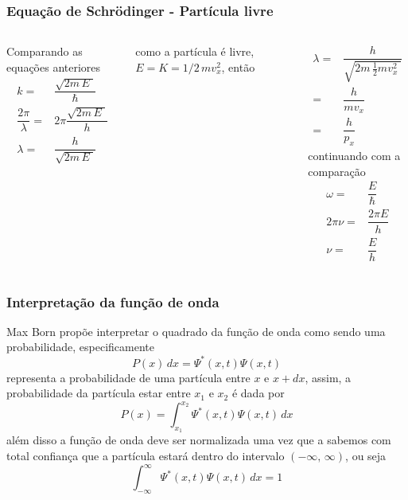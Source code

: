 \documentclass[12pt,brazil]{beamer}
\begin{document}
\begin{frame}
  \frametitle{Equação de Schrödinger - Partícula livre}
  \fontsize{9pt}{11pt}\selectfont
    
    \begin{columns}[c]

      \column{5cm}
    Comparando as equações anteriores
      \[
        \begin{align*}
            k =& \dfrac{\sqrt{2m\,E\;}}{\hbar}\\
            \dfrac{2\pi}{\lambda}=& 2\pi\dfrac{\sqrt{2m\,E\;}}{h}\\
            \lambda =& \dfrac{h}{\sqrt{2m\,E\;}}
          \end{align*}
      \]

      como a partícula é livre, $E=K=1/2\, mv_x^2$, então
      \column{5cm}
      
      \[
        \begin{align*}
            \lambda =& \dfrac{h}{\sqrt{2m\,\frac{1}{2} mv_x^2\;}}\\
            =& \dfrac{h}{mv_x}\\
            =&\dfrac{h}{p_x}
        \end{align*}
      \]
      continuando com a comparação
      \[
       \begin{align*}
            \omega =& \dfrac{E}{\hbar}\\
            2\pi \nu =& \dfrac{2\pi E}{h}\\
            \nu =&  \dfrac{E}{h}
        \end{align*}
      \]
      
    \end{columns}
  
\end{frame}



\begin{frame}
  \frametitle{Interpretação da função de onda}
  \fontsize{9pt}{11pt}\selectfont
  
  Max Born propõe interpretar o quadrado da função de onda como sendo uma probabilidade, especificamente
  \[
   P(x)\, dx = \Psi ^* (x,t) \Psi (x,t)
  \]
  representa a probabilidade de uma partícula entre $x$ e $x+dx$, assim, a probabilidade da partícula estar entre $x_1$ e $x_2$ é dada por
  \[
   P(x) = \int_{x_1}^{x_2}\Psi ^* (x,t) \Psi (x,t)\, dx
  \]
  além disso a função de onda deve ser normalizada uma vez que a sabemos com total confiança que a partícula estará dentro do intervalo $\left( -\infty,\, \infty \right)$, ou seja
  \[
   \int_{-\infty}^{\infty}\Psi ^* (x,t) \Psi (x,t)\, dx = 1
  \]

\end{frame}
  
\end{document}
